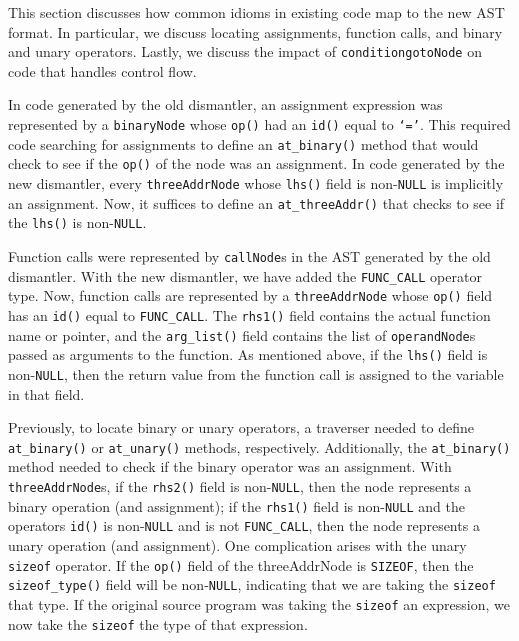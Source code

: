 \documentclass{article}
\begin{document}
This section discusses how common idioms in existing code map to the
new AST format.  In particular, we discuss locating assignments, function
calls, and binary and unary operators.  Lastly, we discuss the impact of
\texttt{conditiongotoNode} on code that handles control flow.

In code generated by the old dismantler, an assignment expression was
represented by a \texttt{binaryNode} whose \texttt{op()} had an
\texttt{id()} equal to \texttt{`='}.  This required code searching for
assignments to define an \texttt{at\_binary()} method that would check to
see if the \texttt{op()} of the node was an assignment.  In code
generated by the new dismantler, every \texttt{threeAddrNode} whose
\texttt{lhs()} field is non-\texttt{NULL} is implicitly an assignment.
Now, it suffices to define an \texttt{at\_threeAddr()} that checks to
see if the \texttt{lhs()} is non-\texttt{NULL}.

Function calls were represented by \texttt{callNode}s in the AST generated
by the old dismantler.  With the new dismantler, we have added the
\texttt{FUNC\_CALL} operator type.  Now, function calls are represented by
a \texttt{threeAddrNode} whose \texttt{op()} field has an \texttt{id()}
equal to \texttt{FUNC\_CALL}.  The \texttt{rhs1()} field contains the actual
function name or pointer, and the \texttt{arg\_list()} field contains
the list of \texttt{operandNode}s passed as arguments to the function.  As
mentioned above, if the \texttt{lhs()} field is non-\texttt{NULL}, then the
return value from the function call is assigned to the variable in that
field.

Previously, to locate binary or unary operators, a traverser needed to define
\texttt{at\_binary()} or \texttt{at\_unary()} methods, respectively.
Additionally, the \texttt{at\_binary()} method needed to check if the binary
operator was an assignment.  With \texttt{threeAddrNode}s, if the 
\texttt{rhs2()} field is non-\texttt{NULL}, then the node represents a binary
operation (and assignment); if the \texttt{rhs1()} field is
non-\texttt{NULL} and the operators \texttt{id()} is non-\texttt{NULL}
and is not \texttt{FUNC\_CALL}, then the node represents a unary
operation (and assignment).  One complication arises with the unary
\texttt{sizeof} operator.  If the \texttt{op()} field of the threeAddrNode
is \texttt{SIZEOF}, then the \texttt{sizeof\_type()} field will be
non-\texttt{NULL}, indicating that we are taking the \texttt{sizeof}
that type.  If the original source program was taking the \texttt{sizeof}
an expression, we now take the \texttt{sizeof} the type of that expression.
\end{document}
